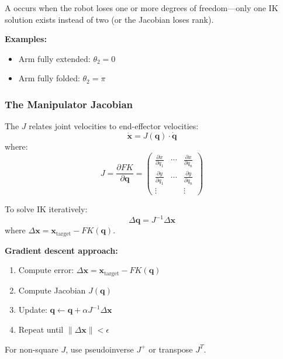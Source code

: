\begin{defbox}[Singularity]
A  occurs when the robot loses one or more degrees of freedom---only one IK solution exists instead of two (or the Jacobian loses rank).

\textbf{Examples:}
\begin{itemize}
  \item Arm fully extended: $\theta_2 = 0$
  \item Arm fully folded: $\theta_2 = \pi$
\end{itemize}
\end{defbox}

\separator

\subsubsection{The Manipulator Jacobian}

\begin{defbox}
The  $J$ relates joint velocities to end-effector velocities:
\[
\dot{\mathbf{x}} = J(\mathbf{q}) \cdot \dot{\mathbf{q}}
\]
where:
\[
J = \frac{\partial FK}{\partial \mathbf{q}} = \begin{pmatrix} \frac{\partial x}{\partial q_1} & \cdots & \frac{\partial x}{\partial q_n} \\ \frac{\partial y}{\partial q_1} & \cdots & \frac{\partial y}{\partial q_n} \\ \vdots & & \vdots \end{pmatrix}
\]
\end{defbox}

\begin{thmbox}
To solve IK iteratively:
\[
\Delta \mathbf{q} = J^{-1} \Delta \mathbf{x}
\]
where $\Delta \mathbf{x} = \mathbf{x}_{\text{target}} - FK(\mathbf{q})$.

\textbf{Gradient descent approach:}
\begin{enumerate}
  \item Compute error: $\Delta \mathbf{x} = \mathbf{x}_{\text{target}} - FK(\mathbf{q})$
  \item Compute Jacobian $J(\mathbf{q})$
  \item Update: $\mathbf{q} \leftarrow \mathbf{q} + \alpha J^{-1} \Delta \mathbf{x}$
  \item Repeat until $\|\Delta \mathbf{x}\| < \epsilon$
\end{enumerate}

For non-square $J$, use pseudoinverse $J^+$ or transpose $J^T$.
\end{thmbox}

